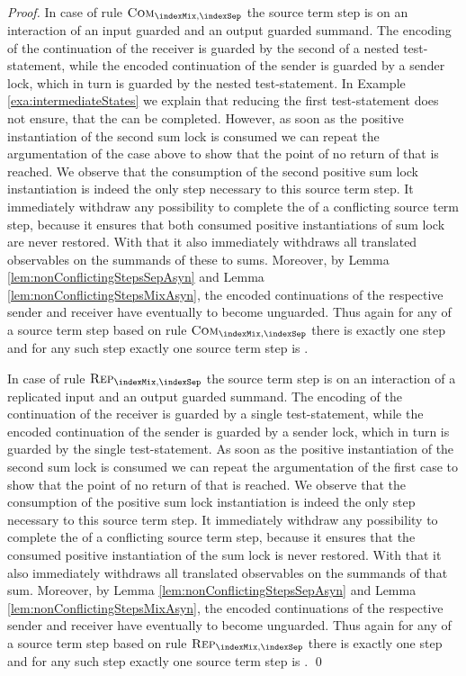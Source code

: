 \documentclass[]{llncs}
\begin{document}
\begin{proof}
	In case of rule $ \textsc{Com}_{\indexMix, \indexSep} $ the source term step is on an interaction of an input guarded and an output guarded summand. The encoding of the continuation of the receiver is guarded by the second of a nested test-statement, while the encoded continuation of the sender is guarded by a sender lock, which in turn is guarded by the nested test-statement. In Example \ref{exa:intermediateStates} we explain that reducing the first test-statement does not ensure, that the \simulation can be completed. However, as soon as the positive instantiation of the second sum lock is consumed we can repeat the argumentation of the case above to show that the point of no return of that \simulation is reached. We observe that the consumption of the second positive sum lock instantiation is indeed the only \nonAdmin step necessary to \simulate this source term step. It immediately withdraw any possibility to complete the \simulation of a conflicting source term step, because it ensures that both consumed positive instantiations of sum lock are never restored. With that it also immediately withdraws all translated observables on the summands of these to sums. Moreover, by Lemma \ref{lem:nonConflictingStepsSepAsyn} and Lemma \ref{lem:nonConflictingStepsMixAsyn}, the encoded continuations of the respective sender and receiver have eventually to become unguarded. Thus again for any \simulation of a source term step based on rule $ \textsc{Com}_{\indexMix, \indexSep} $ there is exactly one \nonAdmin step and for any such \nonAdmin step exactly one source term step is \simulated.
	
	In case of rule $ \textsc{Rep}_{\indexMix, \indexSep} $ the source term step is on an interaction of a replicated input and an output guarded summand. The encoding of the continuation of the receiver is guarded by a single test-statement, while the encoded continuation of the sender is guarded by a sender lock, which in turn is guarded by the single test-statement. As soon as the positive instantiation of the second sum lock is consumed we can repeat the argumentation of the first case to show that the point of no return of that \simulation is reached. We observe that the consumption of the positive sum lock instantiation is indeed the only \nonAdmin step necessary to \simulate this source term step. It immediately withdraw any possibility to complete the \simulation of a conflicting source term step, because it ensures that the consumed positive instantiation of the sum lock is never restored. With that it also immediately withdraws all translated observables on the summands of that sum. Moreover, by Lemma \ref{lem:nonConflictingStepsSepAsyn} and Lemma \ref{lem:nonConflictingStepsMixAsyn}, the encoded continuations of the respective sender and receiver have eventually to become unguarded. Thus again for any \simulation of a source term step based on rule $ \textsc{Rep}_{\indexMix, \indexSep} $ there is exactly one \nonAdmin step and for any such \nonAdmin step exactly one source term step is \simulated.
	\qed
\end{proof}
\end{document}
